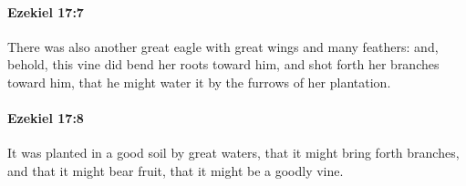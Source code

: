 		\paragraph{Ezekiel 17:7} %
			\label{EZEKIEL-17-7}

			There was also another great eagle with great wings and many feathers: and, behold, this vine did bend her roots toward him, and shot forth her branches toward him, that he might water it by the furrows of her plantation.


		\paragraph{Ezekiel 17:8} %
			\label{EZEKIEL-17-8}

			It was planted in a good soil by great waters, that it might bring forth branches, and that it might bear fruit, that it might be a goodly vine.


